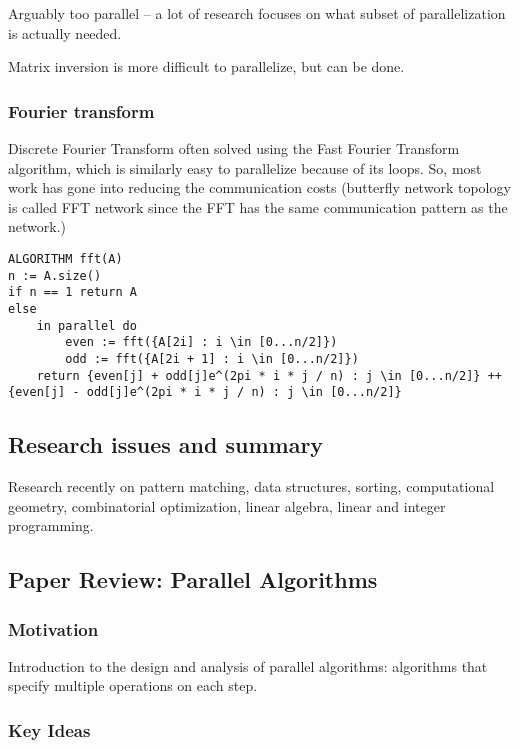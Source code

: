 Arguably too parallel -- a lot of research focuses on what subset of parallelization is actually needed.

Matrix inversion is more difficult to parallelize, but can be done. 

\subsubsection{Fourier transform}

Discrete Fourier Transform often solved using the Fast Fourier Transform algorithm, which is similarly easy to parallelize because of its loops. So, most work has gone into reducing the communication costs (butterfly network topology is called FFT network since the FFT has the same communication pattern as the network.)

\begin{lstlisting}
ALGORITHM fft(A)
n := A.size()
if n == 1 return A
else
    in parallel do
        even := fft({A[2i] : i \in [0...n/2]})
        odd := fft({A[2i + 1] : i \in [0...n/2]})
    return {even[j] + odd[j]e^(2pi * i * j / n) : j \in [0...n/2]} ++ {even[j] - odd[j]e^(2pi * i * j / n) : j \in [0...n/2]} 
\end{lstlisting}

\subsection{Research issues and summary}

Research recently on pattern matching, data structures, sorting, computational geometry, combinatorial optimization, linear algebra, linear and integer programming. 

\newpage

\subsection{Paper Review: Parallel Algorithms}

\subsubsection{Motivation}

Introduction to the design and analysis of parallel algorithms: algorithms that specify multiple operations on each step.

\subsubsection{Key Ideas}

